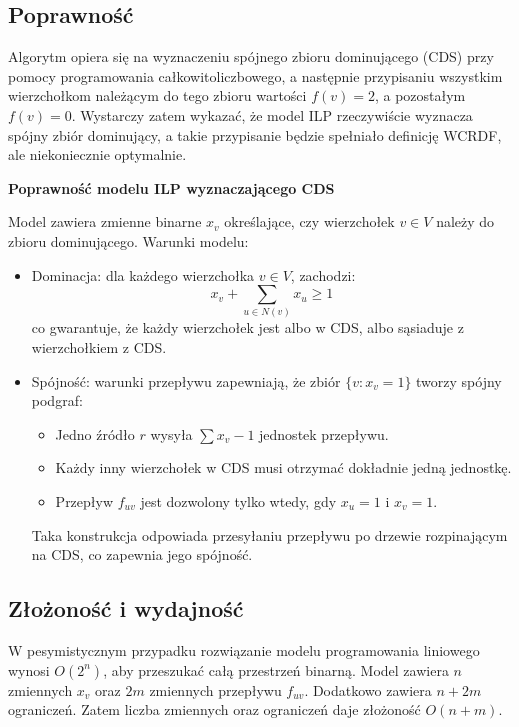 \subsection{Poprawność}

Algorytm opiera się na wyznaczeniu spójnego zbioru dominującego (CDS) przy pomocy programowania całkowitoliczbowego, a następnie przypisaniu wszystkim wierzchołkom należącym do tego zbioru wartości \( f(v) = 2 \), a pozostałym \( f(v) = 0 \). Wystarczy zatem wykazać, że model ILP rzeczywiście wyznacza spójny zbiór dominujący, a takie przypisanie będzie spełniało definicję WCRDF, ale niekoniecznie optymalnie.

\textbf{Poprawność modelu ILP wyznaczającego CDS}

Model zawiera zmienne binarne \( x_v \) określające, czy wierzchołek \( v \in V \) należy do zbioru dominującego. Warunki modelu:

\begin{itemize}
    \item Dominacja: dla każdego wierzchołka \( v \in V \), zachodzi:
    \[
    x_v + \sum_{u \in N(v)} x_u \geq 1
    \]
    co gwarantuje, że każdy wierzchołek jest albo w CDS, albo sąsiaduje z wierzchołkiem z CDS.

    \item Spójność: warunki przepływu zapewniają, że zbiór \( \{v : x_v = 1\} \) tworzy spójny podgraf:
    \begin{itemize}
        \item Jedno źródło  \( r \) wysyła \( \sum x_v - 1 \) jednostek przepływu.
        \item Każdy inny wierzchołek w CDS musi otrzymać dokładnie jedną jednostkę.
        \item Przepływ \( f_{uv} \) jest dozwolony tylko wtedy, gdy \( x_u = 1 \) i \( x_v = 1 \).
    \end{itemize}
    Taka konstrukcja odpowiada przesyłaniu przepływu po drzewie rozpinającym na CDS, co zapewnia jego spójność.
\end{itemize}

\subsection{Złożoność i wydajność}

W pesymistycznym przypadku rozwiązanie modelu programowania liniowego wynosi $O(2^n)$, aby przeszukać całą przestrzeń binarną. Model zawiera $n$ zmiennych $x_v$ oraz $2m$ zmiennych przepływu $f_{uv}$. Dodatkowo zawiera $n + 2m$ ograniczeń. Zatem liczba zmiennych oraz ograniczeń daje złożoność $O(n+m)$.

